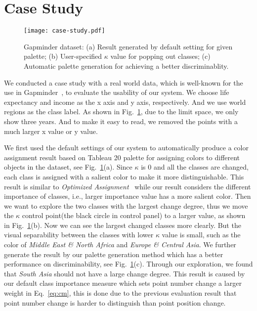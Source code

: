 \section{Case Study}
\label{sec:caseStudy}

\begin{figure}[h]
\centering
\texttt{[image: case-study.pdf]}
\caption{Gapminder dataset: (a) Result generated by default setting for given palette; (b) User-specified $\kappa$ value for popping out classes; (c) Automatic palette generation for achieving a better discriminablity.}
\label{fig:casestudy}
\vspace{-4mm}
\end{figure}


We conducted a case study with a real world data, which is well-known for the use in Gapminder~\cite{gapminder}, to evaluate the usability of our system.
We choose life expectancy and income as the x axis and y axis, respectively. And we use world regions as the class label. As shown in Fig.~\ref{fig:casestudy}, due to the limit space, we only show three years. And to make it easy to read, we removed the points with a much larger x value or y value.

We first used the default settings of our system to automatically produce a color assignment result based on Tableau 20 palette for assigning colors to different objects in the dataset, see Fig.~\ref{fig:casestudy}(a). Since $\kappa$ is $0$ and all the classes are changed, each class is assigned with a salient color to make it more distinguishable. This result is similar to \emph{Optimized Assignment}~\cite{Wang2018} while our result considers the different importance of classes, i.e., larger importance value has a more salient color.
Then we want to explore the two classes with the largest change degree, thus we move the $\kappa$ control point(the black circle in control panel) to a larger value, as shown in Fig.~\ref{fig:casestudy}(b). Now we can see the largest changed classes more clearly. But the visual separability between the classes with lower $\kappa$ value is small, such as the color of \emph{Middle East \& North Africa} and \emph{Europe \& Central Asia}. We further generate the result by our palette generation method which has a better performance on discriminability, see Fig.~\ref{fig:casestudy}(c).
Through our exploration, we found that \emph{South Asia} should not have a large change degree. This result is caused by our default class importance measure which sets point number change a larger weight in Eq.~\ref{eq:cm}, this is done due to the previous evaluation result that point number change is harder to distinguish than point position change.

